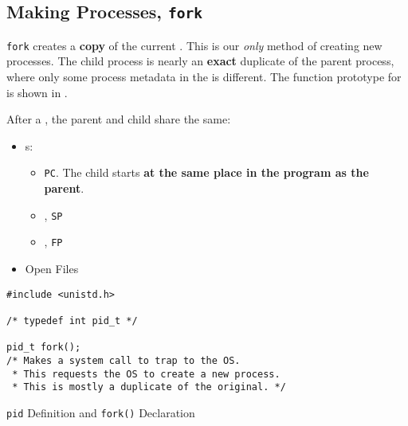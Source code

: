 \subsection{Making Processes, \texttt{fork}}\label{subsec:Making_Processes-fork}
\texttt{fork} creates a \textbf{copy} of the current .
This is our \textit{only} method of creating new processes.
The child process is nearly an \textbf{exact} duplicate of the parent process, where only some process metadata in the  is different.
The function prototype for  is shown in .

After a , the parent and child share the same:
\begin{itemize}[noitemsep]
\item {}s:
  \begin{itemize}[noitemsep]
  \item {} \texttt{PC}.
    The child starts \textbf{at the same place in the program as the parent}.
  \item {}, \texttt{SP}
  \item {}, \texttt{FP}
  \end{itemize}
\item Open Files
\end{itemize}

\begin{listing}[h!tbp]
\begin{verbatim}
#include <unistd.h>

/* typedef int pid_t */

pid_t fork();
/* Makes a system call to trap to the OS.
 * This requests the OS to create a new process.
 * This is mostly a duplicate of the original. */
\end{verbatim}
\caption{\texttt{pid} Definition and \texttt{fork()} Declaration}
\label{lst:PID_Definition_fork_Declaration}
\end{listing}


